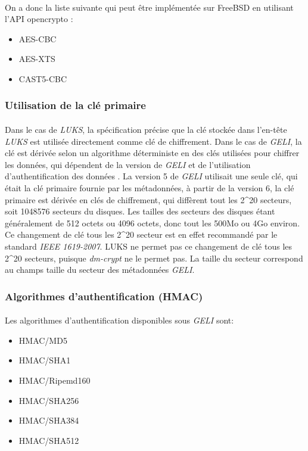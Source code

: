 \paragraph{}
On a donc la liste suivante qui peut être implémentée sur FreeBSD en utilisant 
l'API opencrypto :
\begin{itemize}
	\item{AES-CBC}
	\item{AES-XTS}
	\item{CAST5-CBC}
\end{itemize}


\subsubsection{Utilisation de la clé primaire}
\paragraph{}
Dans le cas de {\em LUKS}, la spécification \cite{onDiskFormatLuks} précise 
que la clé stockée dans l'en-tête {\em LUKS} est utilisée directement comme 
clé de chiffrement. Dans le cas de {\em GELI}, la clé est dérivée selon un 
algorithme déterministe en des clés utilisées pour chiffrer les données, 
qui dépendent de la version de {\em GELI} et de l'utilisation 
d'authentification des données \cite{manGeli}. 
La version 5 de {\em GELI} utilisait une seule clé, qui était la clé
primaire fournie par les métadonnées, à partir de la version 6, la clé primaire
est dérivée en clés de chiffrement, qui diffèrent tout les 2\textasciicircum20 
secteurs, soit 1048576 secteurs du disques. Les tailles des secteurs des 
disques étant généralement de 512 octets ou 4096 octets, 
donc tout les 500Mo ou 4Go environ. Ce changement de clé tous les
2\textasciicircum20 secteur est en effet recommandé par le standard {\em IEEE 1619-2007}.
LUKS ne permet pas ce changement de clé tous les 2\textasciicircum20 secteurs,
puisque {\em dm-crypt} ne le permet pas.
La taille du secteur correspond au champs taille du secteur des métadonnées
{\em GELI}.

\subsubsection{Algorithmes d'authentification (HMAC)}
\paragraph{}
Les algorithmes d'authentification disponibles sous {\em GELI} sont:
\begin{itemize}
	\item HMAC/MD5
	\item HMAC/SHA1
	\item HMAC/Ripemd160
	\item HMAC/SHA256
	\item HMAC/SHA384
	\item HMAC/SHA512
\end{itemize}

